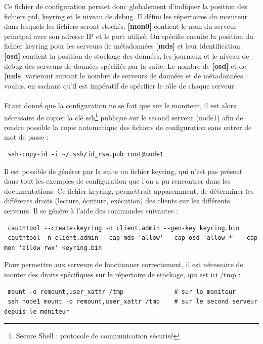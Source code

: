 \documentclass[12pt]{report}
\begin{document}
                        Ce fichier de configuration permet donc globalement d'indiquer la position des fichiers pid, keyring et le niveau de debug. Il défini les répertoires du moniteur dans lesquels les fichiers seront stockés. \textbf{[mon0]} contient le nom du serveur principal avec son adresse IP et le port utilisé. On spécifie ensuite la position du fichier keyring pour les serveurs de métadonnées \textbf{[mds]} et leur identification. \textbf{[osd]} contient la position de stockage des données, les journaux et le niveau de debug des serveurs de données spécifiés par la suite. Le nombre de \textbf{[osd]} et de \textbf{[mds]} varieront suivant le nombre de serveurs de données et de métadonnées voulus, en sachant qu'il est impératif de spécifier le rôle de chaque serveur.\\\\
                        Etant donné que la configuration ne se fait que sur le moniteur, il est alors nécessaire de copier la clé ssh\footnote{Secure Shell : protocole de communication sécurisé} publique sur le second serveur (node1) afin de rendre possible la copie automatique des fichiers de configuration sans entrer de mot de passe :
                        \begin{lstlisting}
 ssh-copy-id -i ~/.ssh/id_rsa.pub root@node1
                        \end{lstlisting}
                        Il est possible de générer par la suite un fichier keyring, qui n'est pas présent dans tout les exemples de configuration que l'on a pu rencontrer dans les documentations. Ce fichier keyring, permettrait apparemment, de déterminer les différents droits (lecture, écriture, exécution) des clients sur les différents serveurs. Il se génère à l'aide des commandes suivantes :
                        \begin{lstlisting}
 cauthtool --create-keyring -n client.admin --gen-key keyring.bin
 cauthtool -n client.admin --cap mds 'allow' --cap osd 'allow *' --cap mon 'allow rwx' keyring.bin
                        \end{lstlisting}
                        Pour permettre aux serveurs de fonctionner correctement, il est nécessaire de monter des droits spécifiques sur le répertoire de stockage, qui est ici /tmp :
                        \begin{lstlisting}
 mount -o remount,user_xattr /tmp              # sur le moniteur
 ssh node1 mount -o remount,user_xattr /tmp    # sur le second serveur depuis le moniteur
                        \end{lstlisting}
\end{document}
